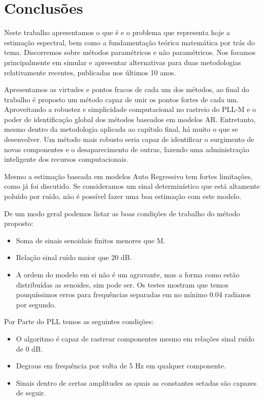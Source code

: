 \section{Conclusões}
Neste trabalho apresentamos o que é e o problema que representa hoje a estimação espectral, bem como a fundamentação teórica matemática por trás do tema. Discorremos sobre métodos paramétricos e não paramétricos. Nos focamos principalmente em simular e apresentar alternativas para duas metodologias relativamente recentes, publicadas nos últimos 10 anos. 

Apresentamos as virtudes e pontos fracos de cada um dos métodos, ao final do trabalho é proposto um método capaz de unir os pontos fortes de cada um. Aproveitando a robustez e simplicidade computacional no rastreio do PLL-M e o poder de identificação global dos métodos baseados em modelos AR. Entretanto, mesmo dentro da metodologia aplicada ao capítulo final, há muito o que se desenvolver. Um método mais robusto seria capaz de identificar o surgimento de novas componentes e o desaparecimento de outras, fazendo uma administração inteligente dos recursos computacionais.

Mesmo a estimação baseada em modelos Auto Regressivo tem fortes limitações, como já foi discutido. Se consideramos um sinal determinístico que está altamente poluído por ruído, não é possível fazer uma boa estimação com este modelo. 

De um modo geral podemos listar as boas condições de trabalho do método proposto:

\begin{itemize}
	\item Soma de sinais senoidais finitos menores que M. 
	\item Relação sinal ruído maior que 20 dB.
	\item A ordem do modelo em si não é um agravante, mas a forma como estão distribuídas as senoides, sim pode ser. Os testes mostram que temos pouquíssimos erros para frequências separadas em no mínimo 0.04 radianos por segundo.
\end{itemize}

Por Parte do PLL temos as seguintes condições:
\begin{itemize}
	\item O algoritmo é capaz de rastrear componentes mesmo em relações sinal ruído de 0 dB.
	\item Degraus em frequência por volta de 5 Hz em qualquer componente. 
	\item Sinais dentro de certas amplitudes as quais as constantes setadas são capazes de seguir.
\end{itemize}

